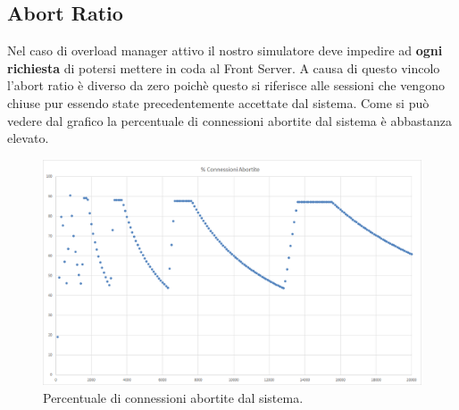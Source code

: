 \subsection{Abort Ratio}
Nel caso di overload manager attivo il nostro simulatore deve impedire ad \textbf{ogni richiesta} di potersi mettere in coda al Front Server.
A causa di questo vincolo l'abort ratio è diverso da zero poichè questo si riferisce alle sessioni che vengono chiuse pur essendo state precedentemente accettate dal sistema. Come si può vedere dal grafico la percentuale di connessioni abortite dal sistema è abbastanza elevato.
\begin{figure}[H]
	\begin{center}
	\includegraphics[scale=0.4]{img/abort_ratio.png}
	\caption[Percentuale di connessioni abortite dal sistema.]{Percentuale di connessioni abortite dal sistema.}
	\label{fig:confr_distrib}
	\end{center}
\end{figure}
